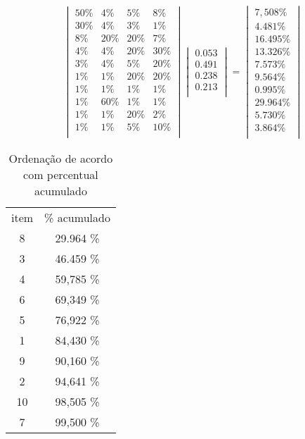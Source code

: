 \documentclass{book}
\begin{document}
\begin{equation}
\begin{vmatrix}
50\% &  4\% &  5\% &  8\% \\
30\% &  4\% &  3\% &  1\% \\
8\% & 20\% & 20\% &  7\% \\
4\% &  4\% & 20\% & 30\% \\
3\% &  4\% &  5\% & 20\% \\
1\% &  1\% & 20\% & 20\% \\
1\% &  1\% &  1\% &  1\% \\
1\% & 60\% &  1\% &  1\% \\
1\% &  1\% & 20\% &  2\% \\
1\% &  1\% &  5\% & 10\% \\
\end{vmatrix}
\begin{vmatrix}
0.053 \\
0.491 \\
0.238 \\
0.213 \\
\end{vmatrix} 
= \begin{vmatrix}
 7,508\% \\
 4.481\% \\
16.495\% \\
13.326\% \\
 7.573\% \\
 9.564\% \\
 0.995\% \\
29.964\% \\
 5.730\% \\
 3.864\% \\
\end{vmatrix} \nonumber
\end{equation}

\begin{table}[h]
\begin{center}
\begin{tabular}[c]{c c}
item & \% acumulado \\
 8 & 29.964 \% \\
 3 & 46.459 \% \\
 4 & 59,785 \% \\
 6 & 69,349 \% \\
 5 & 76,922 \% \\
 1 & 84,430 \% \\
 9 & 90,160 \% \\
 2 & 94,641 \% \\
10 & 98,505 \% \\
 7 & 99,500 \% \\
\end{tabular}
\caption{Ordenação de acordo com percentual acumulado}
\label{tab:ordenada}
\end{center}
\end{table}
\end{document}
